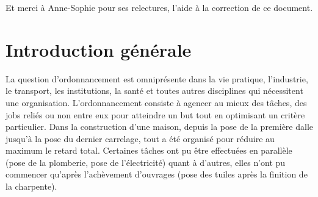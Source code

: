 \documentclass[a4paper,12pt]{report}
\theoremstyle{plain}				%
\theoremstyle{definition}				%
\newcommand{\lp}[1]{\todo[author=LP,color=yellow,inline]{#1}}
\begin{document}
Et merci à Anne-Sophie pour ses relectures, l'aide à la correction de ce document.


%
%
%
\renewcommand{\thesection}{\arabic{section}}
\renewcommand{\contentsname}{Sommaire}
\setcounter{tocdepth}{3}	%
\setcounter{secnumdepth}{3}	%
\tableofcontents


\bigskip


\section{Introduction générale} \label{sec:introductionGenerale}


La question d’ordonnancement est omniprésente dans la vie pratique, l'industrie, le transport, 
  les institutions, la santé et toutes autres disciplines qui nécessitent une organisation.
  L'ordonnancement consiste à agencer au mieux des tâches, des jobs reliés ou non entre eux 
  pour atteindre un but tout en optimisant un critère particulier. 
Dans la construction d'une maison, depuis la pose de la première dalle jusqu'à la pose du dernier carrelage, 
  tout a été organisé pour réduire au maximum le retard total. 
  Certaines tâches ont pu être effectuées en parallèle (pose de la plomberie, pose de l'électricité)  
  quant à d'autres, elles n'ont pu commencer qu'après l'achèvement d'ouvrages 
  (pose des tuiles après la finition de la charpente). 
\end{document}
